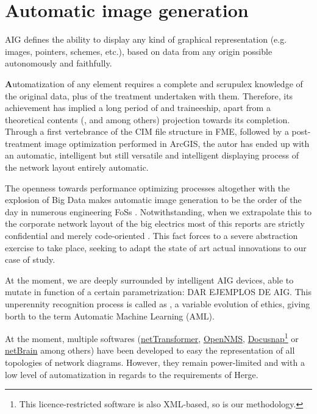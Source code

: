 \chapter[Automatic image generation] {Automatic image generation}
\label{cap:AIG}
\begin{Resumen}
AIG defines the ability to display any kind of graphical representation (e.g. images, pointers, schemes, etc.), based on data from any origin possible autonomously and faithfully.
\end{Resumen}
\PartialToc
\bigskip
\lettrine[lines=2]{\textbf{A}}{}utomatization of any element requires a complete and scrupulex knowledge of the original data, plus of the treatment undertaken with them. Therefore, its achievement has implied a long period of  and  traineeship, apart from a theoretical contents (,  and  among others) projection towards its completion. Through a first vertebrance of the CIM file structure in FME, followed by a post-treatment image optimization performed in ArcGIS, the autor has ended up with an automatic, intelligent but still versatile and intelligent displaying process of the network layout entirely automatic. 

The openness towards performance optimizing processes altogether with the explosion of Big Data makes automatic image generation to be the order of the day in numerous engineering FoSs \cite{Software_diagrams, Deep_learning_image_to_text}. Notwithstanding, when we extrapolate this to the corporate network layout of the big electrics most of this reports are strictly confidential and merely code-oriented \cite{standard-based-SLD-AG,}. This fact forces to a severe abstraction exercise to take place, seeking to adapt the state of art actual innovations to our case of study. 

At the moment, we are deeply surrounded by intelligent AIG devices, able to mutate in function of a certain parametrization: DAR EJEMPLOS DE AIG. This unperennity recognition process is called as , a variable evolution of  ethics, giving borth to the term Automatic Machine Learning (AML). 

At the moment, multiple softwares (\hyperlink{https://github.com/iTransformers/netTransformer}{netTransformer}, \hyperlink{https://github.com/OpenNMS/opennms}{OpenNMS}, \hyperlink{https://www.docusnap.com}{Docusnap}\footnote{This licence-restricted software is also XML-based, so is our methodology.} or \hyperlink{https://www.netbraintech.com}{netBrain} among others) have been developed to easy the representation of all topologies of network diagrams. However, they remain power-limited and with a low level of automatization in regards to the requirements of Herge.



